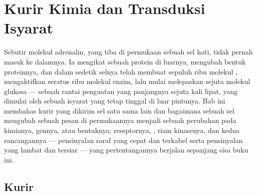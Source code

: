 \chapter{Kurir Kimia dan Transduksi Isyarat}\label{ch:b2:cell-signalling}

Sebutir molekul adrenalin, yang tiba di permukaan sebuah sel hati,
tidak pernah masuk ke dalamnya. Ia mengikat sebuah protein di luarnya,
mengubah bentuk proteinnya, dan dalam sedetik selnya telah membuat
sepuluh ribu molekul , mengaktifkan seratus ribu molekul
enzim, lalu mulai melepaskan sejuta molekul glukosa --- sebuah rantai
penguatan yang panjangnya sejuta kali lipat, yang dimulai oleh sebuah
isyarat yang tetap tinggal di luar pintunya. Bab ini membahas kurir
yang dikirim sel satu sama lain dan bagaimana sebuah sel mengubah
sebuah pesan di permukaannya menjadi sebuah perubahan pada kimianya,
gennya, atau bentuknya: reseptornya, , riam kinasenya,
dan kedua rancangannya --- pensinyalan saraf yang cepat dan terkabel
serta pensinyalan  yang lambat dan tersiar --- yang
pertentangannya berjalan sepanjang sisa buku ini.

\section{Kurir}

